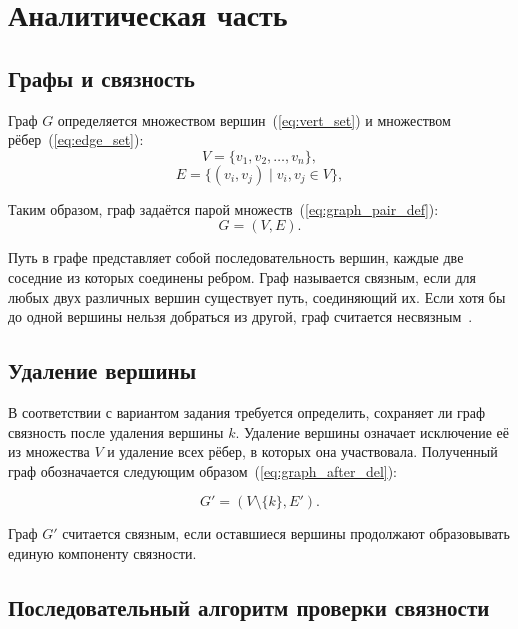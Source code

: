 \chapter{Аналитическая часть}

\section{Графы и связность}

Граф $G$ определяется множеством вершин~(\ref{eq:vert_set}) и множеством рёбер~(\ref{eq:edge_set}):
\begin{equation}
	V = \{ v_1, v_2, \ldots, v_n \},
	\label{eq:vert_set}
\end{equation}
\begin{equation}
	E = \{ (v_i, v_j) \mid v_i, v_j \in V \},
	\label{eq:edge_set}
\end{equation}

Таким образом, граф задаётся парой множеств~(\ref{eq:graph_pair_def}):
\begin{equation}
	G = (V, E).
	\label{eq:graph_pair_def}
\end{equation}

Путь в графе представляет собой последовательность вершин, каждые две соседние из которых соединены ребром.  
Граф называется связным, если для любых двух различных вершин существует путь, соединяющий их.  
Если хотя бы до одной вершины нельзя добраться из другой, граф считается несвязным~\cite{aho}.

\section{Удаление вершины}

В соответствии с вариантом задания требуется определить, сохраняет ли граф связность после удаления вершины $k$.  
Удаление вершины означает исключение её из множества $V$ и удаление всех рёбер, в которых она участвовала.  
Полученный граф обозначается следующим образом~(\ref{eq:graph_after_del}):

\begin{equation}
	G' = (V \setminus \{k\}, E').
	\label{eq:graph_after_del}
\end{equation}

Граф $G'$ считается связным, если оставшиеся вершины продолжают образовывать единую компоненту связности.

\section{Последовательный алгоритм проверки связности}

